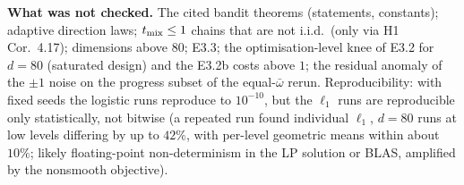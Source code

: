 \documentclass[11pt,a4paper]{article}
\numberwithin{equation}{section}
\theoremstyle{definition}
\theoremstyle{remark}
\newcommand{\wbar}{\bar\omega}\newcommand{\Atwo}{\cA^{\rm 2pt}_\gamma}
\begin{document}
\textbf{What was not checked.} The cited bandit theorems (statements, constants); adaptive direction laws; $t_{\rm mix}\le1$ chains that are not i.i.d.\ (only via H1 Cor.~4.17); dimensions above $80$; E3.3; the optimisation-level knee of E3.2 for $d=80$ (saturated design) and the E3.2b costs above $1$; the residual anomaly of the $\pm1$ noise on the progress subset of the equal-$\wbar$ rerun. Reproducibility: with fixed seeds the logistic runs reproduce to $10^{-10}$, but the $\ell_1$ runs are reproducible only statistically, not bitwise (a repeated run found individual $\ell_1$, $d=80$ runs at low levels differing by up to $42\%$, with per-level geometric means within about $10\%$; likely floating-point non-determinism in the LP solution or BLAS, amplified by the nonsmooth objective).
\end{document}
